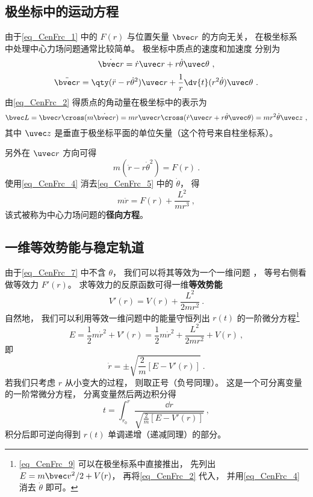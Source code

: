 \subsection{极坐标中的运动方程}
由于\autoref{eq_CenFrc_1} 中的 $F(r)$ 与位置矢量 $\bvec r$ 的方向无关， 在极坐标系 中处理中心力场问题通常比较简单。 极坐标中质点的速度和加速度 分别为
\begin{equation}\label{eq_CenFrc_2}
\dot{\bvec r} = \dot r \uvec r + r\dot\theta\uvec\theta~,
\end{equation}
\begin{equation}\label{eq_CenFrc_3}
\ddot{\bvec r} = \qty(\ddot{r} - r \dot\theta^2)\uvec r + \frac 1r \dv{t} (r^2\dot\theta)\uvec \theta~.
\end{equation}
由\autoref{eq_CenFrc_2} 得质点的角动量在极坐标中的表示为
\begin{equation}\label{eq_CenFrc_4}
\bvec L = \bvec r \cross (m \dot{\bvec r})
= mr \uvec r \cross (\dot r \uvec r + r\dot\theta \uvec\theta)
= mr^2\dot \theta \uvec z~,
\end{equation}
其中 $\uvec z$ 是垂直于极坐标平面的单位矢量（这个符号来自柱坐标系）。 

另外在 $\uvec r$ 方向可得
\begin{equation}\label{eq_CenFrc_5}
m(\ddot{r} - r \dot\theta^2) = F(r)~.
\end{equation}
使用\autoref{eq_CenFrc_4} 消去\autoref{eq_CenFrc_5} 中的 $\dot\theta$， 得
\begin{equation}\label{eq_CenFrc_7}
m\ddot r = F(r) + \frac{L^2}{mr^3}~,
\end{equation}
该式被称为中心力场问题的\textbf{径向方程}。

\subsection{一维等效势能与稳定轨道}
由于\autoref{eq_CenFrc_7} 中不含 $\theta$， 我们可以将其等效为一个一维问题%
， 等号右侧看做等效力 $F'(r)$。 求等效力的反原函数可得一维\textbf{等效势能}
\begin{equation}\label{eq_CenFrc_6}
V'(r) = V(r) + \frac{L^2}{2mr^2}~.
\end{equation}
自然地， 我们可以利用等效一维问题中的能量守恒列出 $r(t)$ 的一阶微分方程\footnote{\autoref{eq_CenFrc_9} 可以在极坐标系中直接推出， 先列出 $E = m\bvec v^2/2 + V(r)$， 再将\autoref{eq_CenFrc_2} 代入， 并用\autoref{eq_CenFrc_4} 消去 $\dot\theta$ 即可。}
\begin{equation}\label{eq_CenFrc_9}
E = \frac 12 m\dot r^2 + V'(r) = \frac 12 m\dot r^2 + \frac{L^2}{2mr^2} + V(r)~,
\end{equation}
即
\begin{equation}\label{eq_CenFrc_10}
\dot r = \pm\sqrt{\frac 2m [E - V'(r)]}~.
\end{equation}
若我们只考虑 $r$ 从小变大的过程， 则取正号（负号同理）。 这是一个可分离变量的一阶常微分方程， %
分离变量然后两边积分得
\begin{equation}\label{eq_CenFrc_8}
t = \int_{r_0}^{r} \frac{\dd{r}}{\sqrt{\frac 2m [E - V'(r)]}}~,
\end{equation}
积分后即可逆向得到 $r(t)$ 单调递增（递减同理）的部分。

